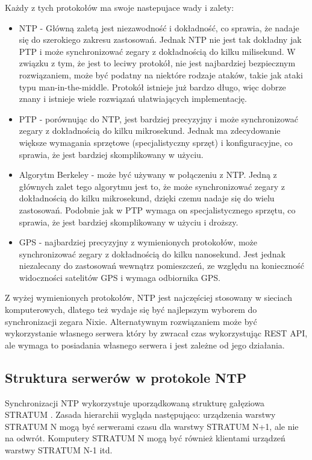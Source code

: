 \documentclass[../main.tex]{subfiles}
\begin{document}
Każdy z tych protokołów ma swoje nastepujace wady i zalety:

\newpage
\begin{itemize}
  \item NTP - Główną zaletą jest niezawodność i dokładność, co sprawia, że nadaje się do szerokiego zakresu zastosowań. 
  Jednak NTP nie jest tak dokładny jak PTP i może synchronizować zegary z dokładnością do kilku milisekund.
  W związku z tym, że jest to leciwy protokół, nie jest najbardziej bezpiecznym rozwiązaniem, 
  może być podatny na niektóre rodzaje ataków, takie jak ataki typu man-in-the-middle.
  Protokół istnieje już bardzo długo, więc dobrze znany i istnieje wiele rozwiązań ułatwiających implementację.
  \item PTP - porównując do NTP, jest bardziej precyzyjny i może synchronizować zegary z dokładnością do kilku mikrosekund.
  Jednak ma zdecydowanie większe wymagania sprzętowe (specjalistyczny sprzęt) i konfiguracyjne, co sprawia, że jest bardziej skomplikowany w użyciu.
  \item Algorytm Berkeley - może być używany w połączeniu z NTP. 
  Jedną z głównych zalet tego algorytmu jest to, że może synchronizować zegary z dokładnością do kilku mikrosekund, dzięki czemu nadaje się do wielu zastosowań.
  Podobnie jak w PTP wymaga on specjalistycznego sprzętu, co sprawia, że jest bardziej skomplikowany w użyciu i droższy.
  \item GPS - najbardziej precyzyjny z wymienionych protokołów, może synchronizować zegary z dokładnością do kilku nanosekund.
  Jest jednak niezalecany do zastosowań wewnątrz pomieszczeń, ze względu na konieczność widoczności satelitów GPS i wymaga odbiornika GPS.
\end{itemize} 

Z wyżej wymienionych protokołów, NTP jest najczęściej stosowany w sieciach komputerowych, dlatego też wydaje się być najlepszym wyborem do synchronizacji zegara Nixie.
Alternatywnym rozwiązaniem może być wykorzystanie własnego serwera który by zwracał czas wykorzystując REST API, ale wymaga to posiadania własnego serwera i jest zależne od 
jego działania.

\subsection{Struktura serwerów w protokole NTP}
Synchronizacji NTP wykorzystuje uporządkowaną strukturę gałęziowa STRATUM \cite{st:serwerczasu}. 
Zasada hierarchii wygląda następująco: urządzenia warstwy STRATUM N mogą być serwerami czasu dla warstwy STRATUM N+1, ale nie na odwrót. 
Komputery STRATUM N mogą być również klientami urządzeń warstwy STRATUM N-1 itd.
\end{document}
